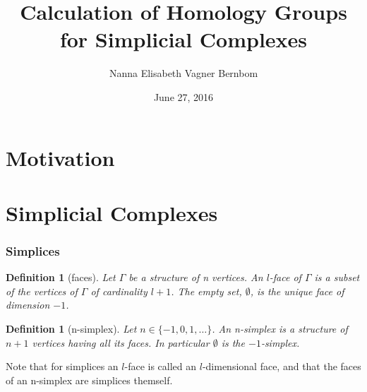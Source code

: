 \documentclass{beamer}
\newtheorem{mydef}[mythm]{Definition}
\begin{document}
\lstset{language=python,frame=single,breaklines=true}

\title{\textbf{Calculation of Homology Groups\\for Simplicial Complexes}}   
\author{Nanna Elisabeth Vagner Bernbom} 
\date{June 27, 2016} 

\frame{\titlepage} 

\section{Motivation}

\section{Simplicial Complexes} 
\begin{frame}
\frametitle{Simplices} 
\begin{mydef}[faces]
Let $\Gamma$ be a structure of n vertices. An $l$-face of $\Gamma$ is a subset of the vertices of $\Gamma$ of cardinality $l+1$. The empty set, $\emptyset$, is the unique face of dimension $-1$.
\end{mydef}
\pause

\begin{mydef}[n-simplex]
Let $n\in\{-1,0,1,\dots\}$. An n-simplex is a structure of $n+1$ vertices having all its faces. In particular $\emptyset$ is the $-1$-simplex.
\end{mydef}\pause
Note that for simplices an $l$-face is called an $l$-dimensional face, and that the faces of an n-simplex are simplices themself.
\end{frame}

\end{document}
